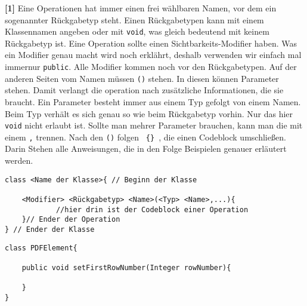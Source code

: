 \begin{enumerate}
          \textbf{[1]} Eine Operationen hat immer einen frei wählbaren Namen, vor dem ein sogenannter Rückgabetyp steht.
          Einen Rückgabetypen kann mit einem Klassennamen angeben oder mit \lstinline{void}, was gleich bedeutend mit keinem      Rückgabetyp ist.
          Eine Operation sollte einen Sichtbarkeits-Modifier haben.
          Was ein Modifier genau macht wird noch erklährt, deshalb verwenden wir einfach mal immernur \lstinline{public}.
          Alle Modifier kommen noch vor den Rückgabetypen.
          Auf der anderen Seiten vom Namen müssen \lstinline{()} stehen.
          In diesen können Parameter stehen. Damit verlangt die operation nach zusätzliche Informationen, die sie braucht. Ein Parameter besteht immer aus einem Typ gefolgt von einem Namen.
          Beim Typ verhält es sich genau so wie beim Rückgabetyp vorhin. Nur das hier \lstinline{void} nicht erlaubt ist.
          Sollte man mehrer Parameter brauchen, kann man die mit einem \lstinline{,} trennen.
          Nach den \lstinline{()} folgen \texttt{ \{\} }, die einen Codeblock umschließen. Darin Stehen alle Anweisungen, die in den Folge Beispielen genauer erläutert werden.

          \begin{lstlisting}[title={\textbf{Klassen Syntax}}]
class <Name der Klasse>{ // Beginn der Klasse

    <Modifier> <Rückgabetyp> <Name>(<Typ> <Name>,...){
            //hier drin ist der Codeblock einer Operation
    }// Ender der Operation
} // Ender der Klasse
                \end{lstlisting}
          \begin{lstlisting}[title={\textbf{Klassen Beispiel}}]
class PDFElement{
        
    public void setFirstRowNumber(Integer rowNumber){
                
    }                    
}
                                    \end{lstlisting}
          


\end{enumerate}
